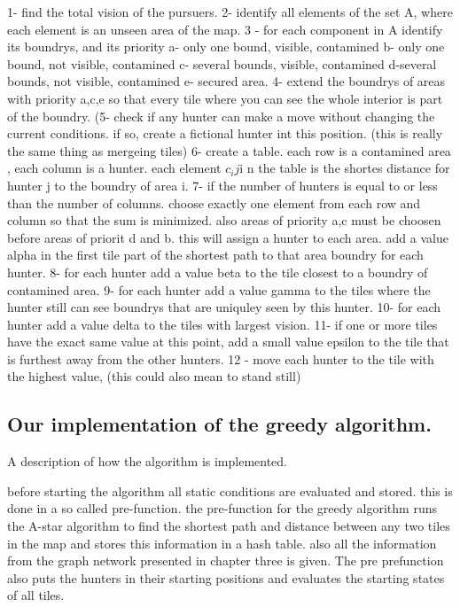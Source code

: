 1- find the total vision of the pursuers.
2- identify all elements of the set  A, where each element is an unseen area of the map.
3 - for each component in A identify its boundrys, and its priority
	a- only one bound, visible, contamined
	b- only one bound, not visible, contamined
	c- several bounds, visible, contamined
	d-several bounds, not visible, contamined
	e- secured area.
4- extend the boundrys of areas with priority a,c,e so that every tile where you can see the whole interior is part of the boundry.
(5- check if any hunter can make a move without changing the current conditions. if so, create  a fictional hunter int this position. (this is really the same thing as mergeing tiles)
6- create a table. each row is a contamined area , each column is a hunter. each element $c_ij$i n the table is the shortes distance for hunter j to the boundry of area i.
7- if the number of hunters is equal to or less than the number of columns. choose exactly one element from each row and column so that the sum is minimized. also areas of priority a,c must be choosen before areas of priorit d and b. this will assign a hunter to each area. add a value alpha in the first tile part of the shortest path to that area boundry for each hunter.
8- for each hunter add a value beta to the tile closest to a boundry of contamined area.
9- for each hunter add a value gamma to the tiles where the hunter still can see boundrys that are uniquley seen by this hunter.
10- for each hunter add a value delta to the tiles with largest vision.
11- if one or more tiles have the exact same value at this point, add a small value epsilon to the tile that is furthest away from the other hunters.
12 - move each hunter to the tile with the highest value, (this could also mean to stand still)



\subsection{Our implementation of the greedy algorithm.}
A description of how the algorithm is implemented.

before starting the algorithm all static conditions are evaluated and stored. this is done in a so called pre-function. the pre-function for the greedy algorithm runs the A-star algorithm to find the shortest path and distance between any two tiles in the map and stores this information in a hash table. also all the information from the graph network presented in chapter three is given. The pre prefunction also puts the hunters in their starting positions and evaluates the starting states of all tiles.


